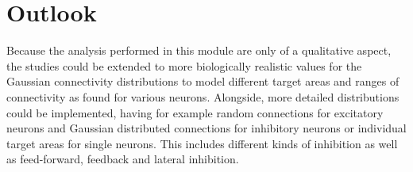 \documentclass[14pt]{SelfArx} %
\numberwithin{equation}{section}
\begin{document}
\section{Outlook}
Because the analysis performed in this module are only of a qualitative aspect, the studies could be extended to more biologically realistic values for the Gaussian connectivity distributions to model different target areas and ranges of connectivity as found for various neurons. \newline
Alongside, more detailed distributions could be implemented, having for example random connections for excitatory neurons and Gaussian distributed connections for inhibitory neurons or individual target areas for single neurons. This includes different kinds of inhibition as well as feed-forward, feedback and lateral inhibition.
\end{document}
